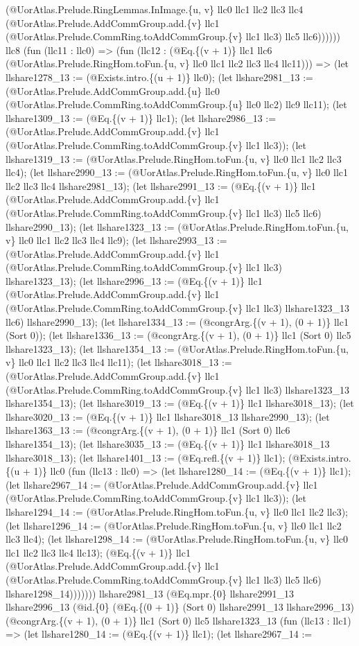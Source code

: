 \documentclass[11pt]{article}
\begin{document}
(@UorAtlas.Prelude.RingLemmas.InImage.\{u, v\} llc0 llc1 llc2 llc3 llc4 (@UorAtlas.Prelude.AddCommGroup.add.\{v\} llc1 (@UorAtlas.Prelude.CommRing.toAddCommGroup.\{v\} llc1 llc3) llc5 llc6)))))) llc8 (fun (llc11 : llc0) => (fun (llc12 : (@Eq.\{(v + 1)\} llc1 llc6 (@UorAtlas.Prelude.RingHom.toFun.\{u, v\} llc0 llc1 llc2 llc3 llc4 llc11))) => (let llshare1278\_13 := (@Exists.intro.\{(u + 1)\} llc0); (let llshare2981\_13 := (@UorAtlas.Prelude.AddCommGroup.add.\{u\} llc0 (@UorAtlas.Prelude.CommRing.toAddCommGroup.\{u\} llc0 llc2) llc9 llc11); (let llshare1309\_13 := (@Eq.\{(v + 1)\} llc1); (let llshare2986\_13 := (@UorAtlas.Prelude.AddCommGroup.add.\{v\} llc1 (@UorAtlas.Prelude.CommRing.toAddCommGroup.\{v\} llc1 llc3)); (let llshare1319\_13 := (@UorAtlas.Prelude.RingHom.toFun.\{u, v\} llc0 llc1 llc2 llc3 llc4); (let llshare2990\_13 := (@UorAtlas.Prelude.RingHom.toFun.\{u, v\} llc0 llc1 llc2 llc3 llc4 llshare2981\_13); (let llshare2991\_13 := (@Eq.\{(v + 1)\} llc1 (@UorAtlas.Prelude.AddCommGroup.add.\{v\} llc1 (@UorAtlas.Prelude.CommRing.toAddCommGroup.\{v\} llc1 llc3) llc5 llc6) llshare2990\_13); (let llshare1323\_13 := (@UorAtlas.Prelude.RingHom.toFun.\{u, v\} llc0 llc1 llc2 llc3 llc4 llc9); (let llshare2993\_13 := (@UorAtlas.Prelude.AddCommGroup.add.\{v\} llc1 (@UorAtlas.Prelude.CommRing.toAddCommGroup.\{v\} llc1 llc3) llshare1323\_13); (let llshare2996\_13 := (@Eq.\{(v + 1)\} llc1 (@UorAtlas.Prelude.AddCommGroup.add.\{v\} llc1 (@UorAtlas.Prelude.CommRing.toAddCommGroup.\{v\} llc1 llc3) llshare1323\_13 llc6) llshare2990\_13); (let llshare1334\_13 := (@congrArg.\{(v + 1), (0 + 1)\} llc1 (Sort 0)); (let llshare1336\_13 := (@congrArg.\{(v + 1), (0 + 1)\} llc1 (Sort 0) llc5 llshare1323\_13); (let llshare1354\_13 := (@UorAtlas.Prelude.RingHom.toFun.\{u, v\} llc0 llc1 llc2 llc3 llc4 llc11); (let llshare3018\_13 := (@UorAtlas.Prelude.AddCommGroup.add.\{v\} llc1 (@UorAtlas.Prelude.CommRing.toAddCommGroup.\{v\} llc1 llc3) llshare1323\_13 llshare1354\_13); (let llshare3019\_13 := (@Eq.\{(v + 1)\} llc1 llshare3018\_13); (let llshare3020\_13 := (@Eq.\{(v + 1)\} llc1 llshare3018\_13 llshare2990\_13); (let llshare1363\_13 := (@congrArg.\{(v + 1), (0 + 1)\} llc1 (Sort 0) llc6 llshare1354\_13); (let llshare3035\_13 := (@Eq.\{(v + 1)\} llc1 llshare3018\_13 llshare3018\_13); (let llshare1401\_13 := (@Eq.refl.\{(v + 1)\} llc1); (@Exists.intro.\{(u + 1)\} llc0 (fun (llc13 : llc0) => (let llshare1280\_14 := (@Eq.\{(v + 1)\} llc1); (let llshare2967\_14 := (@UorAtlas.Prelude.AddCommGroup.add.\{v\} llc1 (@UorAtlas.Prelude.CommRing.toAddCommGroup.\{v\} llc1 llc3)); (let llshare1294\_14 := (@UorAtlas.Prelude.RingHom.toFun.\{u, v\} llc0 llc1 llc2 llc3); (let llshare1296\_14 := (@UorAtlas.Prelude.RingHom.toFun.\{u, v\} llc0 llc1 llc2 llc3 llc4); (let llshare1298\_14 := (@UorAtlas.Prelude.RingHom.toFun.\{u, v\} llc0 llc1 llc2 llc3 llc4 llc13); (@Eq.\{(v + 1)\} llc1 (@UorAtlas.Prelude.AddCommGroup.add.\{v\} llc1 (@UorAtlas.Prelude.CommRing.toAddCommGroup.\{v\} llc1 llc3) llc5 llc6) llshare1298\_14))))))) llshare2981\_13 (@Eq.mpr.\{0\} llshare2991\_13 llshare2996\_13 (@id.\{0\} (@Eq.\{(0 + 1)\} (Sort 0) llshare2991\_13 llshare2996\_13) (@congrArg.\{(v + 1), (0 + 1)\} llc1 (Sort 0) llc5 llshare1323\_13 (fun (llc13 : llc1) => (let llshare1280\_14 := (@Eq.\{(v + 1)\} llc1); (let llshare2967\_14 := 
\end{document}
